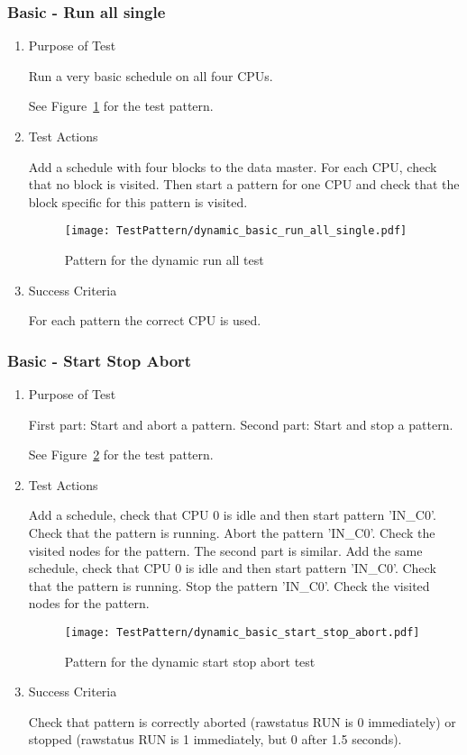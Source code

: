 \subsubsection{Basic - Run all single}
\begin{enumerate}
	\item Purpose of Test

    Run a very basic schedule on all four CPUs.

	See Figure~\ref{fig:Pattern_for_the_dynamic_run_all_test} for the test pattern.
	\item Test Actions

	Add a schedule with four blocks to the data master. For each CPU, check that no block is visited. Then start
	a pattern for one CPU and check that the block specific for this pattern is visited.
    \begin{figure}
        \centering
        \texttt{[image: TestPattern/dynamic\_basic\_run\_all\_single.pdf]}
        \caption{Pattern for the dynamic run all test}
        \label{fig:Pattern_for_the_dynamic_run_all_test}
    \end{figure}
	\item Success Criteria

	For each pattern the correct CPU is used.
\end{enumerate}
\subsubsection{Basic - Start Stop Abort}
\begin{enumerate}
	\item Purpose of Test

    First part: Start and abort a pattern. Second part: Start and stop a pattern.

	See Figure~\ref{fig:Pattern_for_the_dynamic_start_stop_abort_test} for the test pattern.
	\item Test Actions

    Add a schedule, check that CPU 0 is idle and then start pattern 'IN\_C0'. Check that the pattern is running.
    Abort the pattern 'IN\_C0'. Check the visited nodes for the pattern. The second part is similar.
    Add the same schedule, check that CPU 0 is idle and then start pattern 'IN\_C0'. Check that the pattern is running.
    Stop the pattern 'IN\_C0'. Check the visited nodes for the pattern.
    \begin{figure}
        \centering
        \texttt{[image: TestPattern/dynamic\_basic\_start\_stop\_abort.pdf]}
        \caption{Pattern for the dynamic start stop abort test}
        \label{fig:Pattern_for_the_dynamic_start_stop_abort_test}
    \end{figure}
	\item Success Criteria

	Check that pattern is correctly aborted (rawstatus RUN is 0 immediately) or
	stopped (rawstatus RUN is 1 immediately, but 0 after 1.5 seconds).
\end{enumerate}
